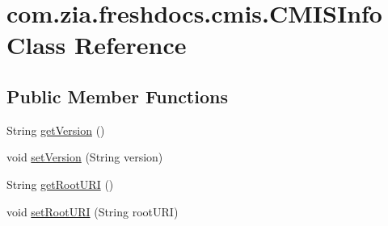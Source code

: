 \hypertarget{classcom_1_1zia_1_1freshdocs_1_1cmis_1_1_c_m_i_s_info}{\section{com.\-zia.\-freshdocs.\-cmis.\-C\-M\-I\-S\-Info Class Reference}
\label{classcom_1_1zia_1_1freshdocs_1_1cmis_1_1_c_m_i_s_info}
}
\subsection*{Public Member Functions}
\begin{DoxyCompactItemize}
\item 
String \hyperlink{classcom_1_1zia_1_1freshdocs_1_1cmis_1_1_c_m_i_s_info_ade35d945bfaf06a7c24985effba6f278}{get\-Version} ()
\item 
void \hyperlink{classcom_1_1zia_1_1freshdocs_1_1cmis_1_1_c_m_i_s_info_a5fe7cd8291e4afa15791fcb89e840672}{set\-Version} (String version)
\item 
String \hyperlink{classcom_1_1zia_1_1freshdocs_1_1cmis_1_1_c_m_i_s_info_a2fede242aea42339a11259984415779b}{get\-Root\-U\-R\-I} ()
\item 
void \hyperlink{classcom_1_1zia_1_1freshdocs_1_1cmis_1_1_c_m_i_s_info_a6201f407c95641d08b26981965a66d9c}{set\-Root\-U\-R\-I} (String root\-U\-R\-I)
\end{DoxyCompactItemize}


